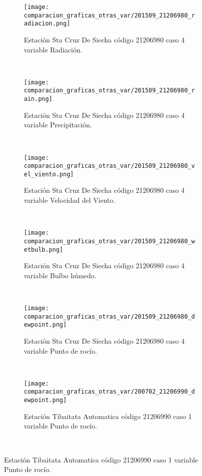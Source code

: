 \begin{figure}[H]
\centering
\begin{subfigure}[normla]{0.4\textwidth}
\caption{Estación Sta Cruz De Siecha código 21206980 caso 4 variable Radiación.}
\texttt{[image: comparacion\_graficas\_otras\_var/201509\_21206980\_radiacion.png]}
\end{subfigure}
~
\begin{subfigure}[normla]{0.4\textwidth}
\caption{Estación Sta Cruz De Siecha código 21206980 caso 4 variable Precipitación.}
\texttt{[image: comparacion\_graficas\_otras\_var/201509\_21206980\_rain.png]}
\end{subfigure}
~
\begin{subfigure}[normla]{0.4\textwidth}
\caption{Estación Sta Cruz De Siecha código 21206980 caso 4 variable Velocidad del Viento.}
\texttt{[image: comparacion\_graficas\_otras\_var/201509\_21206980\_vel\_viento.png]}
\end{subfigure}
~
\begin{subfigure}[normla]{0.4\textwidth}
\caption{Estación Sta Cruz De Siecha código 21206980 caso 4 variable Bulbo húmedo.}
\texttt{[image: comparacion\_graficas\_otras\_var/201509\_21206980\_wetbulb.png]}
\end{subfigure}
~
\begin{subfigure}[normla]{0.4\textwidth}
\caption{Estación Sta Cruz De Siecha código 21206980 caso 4 variable Punto de rocío.}
\texttt{[image: comparacion\_graficas\_otras\_var/201509\_21206980\_dewpoint.png]}
\end{subfigure}
~
\begin{subfigure}[normla]{0.4\textwidth}
\caption{Estación Tibaitata Automatica código 21206990 caso 1 variable Punto de rocío.}
\texttt{[image: comparacion\_graficas\_otras\_var/200702\_21206990\_dewpoint.png]}
\end{subfigure}
~
\end{figure}
           
